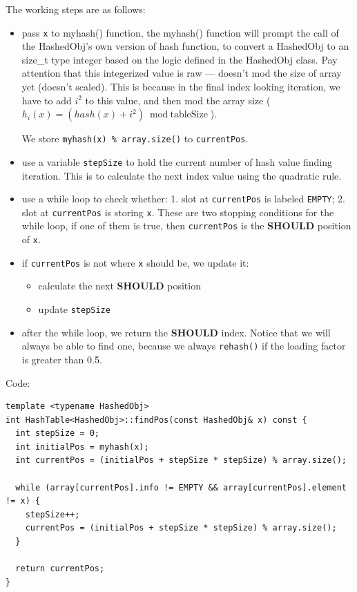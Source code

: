 \documentclass[12pt]{book}
\begin{document}
The working steps are as follows:
\begin{itemize}
\item pass \texttt{x} to myhash() function, the myhash() function will prompt the call of the HashedObj's own version of hash function, to convert a HashedObj to an size\_t type integer based on the logic defined in the HashedObj class. Pay attention that this integerized value is raw --- doesn't mod the size of array yet (doesn't scaled). This is because in the final index looking iteration, we have to add \(i^2\) to this value, and then mod the array size (\(h_i(x) = (hash(x) + i^2) \bmod \text{tableSize}\)).

We store \texttt{myhash(x) \% array.size()} to \texttt{currentPos}.
\item use a variable \texttt{stepSize} to hold the current number of hash value finding iteration. This is to calculate the next index value using the quadratic rule.
\item use a while loop to check whether: 1. slot at \texttt{currentPos} is labeled \texttt{EMPTY}; 2. slot at \texttt{currentPos} is storing \texttt{x}. These are two stopping conditions for the while loop, if one of them is true, then \texttt{currentPos} is the \textbf{SHOULD} position of \texttt{x}.
\item if \texttt{currentPos} is not where \texttt{x} should be, we update it:
\begin{itemize}
\item calculate the next \textbf{SHOULD} position
\item update \texttt{stepSize}
\end{itemize}
\item after the while loop, we return the \textbf{SHOULD} index. Notice that we will always be able to find one, because we always \texttt{rehash()} if the loading factor is greater than 0.5.
\end{itemize}

Code:
\begin{verbatim}
template <typename HashedObj>
int HashTable<HashedObj>::findPos(const HashedObj& x) const {
  int stepSize = 0;
  int initialPos = myhash(x);
  int currentPos = (initialPos + stepSize * stepSize) % array.size();

  while (array[currentPos].info != EMPTY && array[currentPos].element != x) {
    stepSize++;
    currentPos = (initialPos + stepSize * stepSize) % array.size();
  }

  return currentPos;  
}
\end{verbatim}
\end{document}
